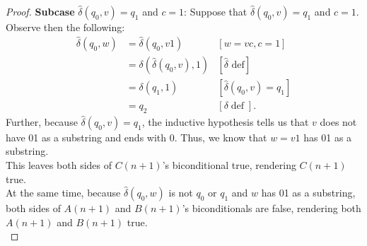 \documentclass[10pt]{article}
\begin{document}
\begin{enumerate}[label={}]
\begin{proof}
              \textbf{Subcase }$\hat{\delta}\left(q_0, v\right)=q_1$ and $c=1$: Suppose that $\hat{\delta}\left(q_0, v\right)=q_1$ and $c=1$. Observe then the following:
              $$
                  \begin{aligned}
                      \hat{\delta}\left(q_0, w\right) & =\hat{\delta}\left(q_0, v 1\right)                     & {[w=v c, c=1] }                                     \\
                                                      & =\delta\left(\hat{\delta}\left(q_0, v\right), 1\right) & {[\hat{\delta} \text { def}] }                      \\
                                                      & =\delta\left(q_1, 1\right)                             & {\left[\hat{\delta}\left(q_0, v\right)=q_1\right] } \\
                                                      & =q_2                                                   & {[\delta \operatorname{def}] . }
                  \end{aligned}
              $$
              Further, because $\hat{\delta}\left(q_0, v\right)=q_1$, the inductive hypothesis tells us that $v$ does not have 01 as a substring and ends with 0. Thus, we know that $w=v1$ has 01 as a substring.\\
              This leaves both sides of $C(n+1)$'s biconditional true, rendering $C(n+1)$ true.\\
              At the same time, because $\hat{\delta}\left(q_0, w\right)$ is not $q_0$ or $q_1$ and $w$ has 01 as a substring, both sides of $A(n+1)$ and $B(n+1)$'s biconditionals are false, rendering both $A(n+1)$ and $B(n+1)$ true.\\


\end{proof}
\end{enumerate}
\end{document}
